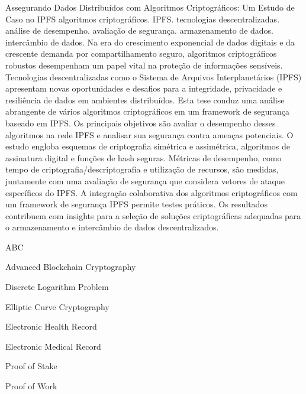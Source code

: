 \documentclass[cic,tc,english]{iiufrgs}
\begin{document}
\begin{translatedabstract}
    { %
        Assegurando Dados Distribuídos com Algoritmos Criptográficos: Um Estudo de 
        Caso no IPFS
    }{ %
        algoritmos criptográficos. 
        IPFS. 
        tecnologias descentralizadas. 
        análise de desempenho. 
        avaliação de segurança. 
        armazenamento de dados. 
        intercâmbio de dados.
    }
    Na era do crescimento exponencial de dados digitais e da crescente demanda 
    por compartilhamento seguro, algoritmos criptográficos robustos desempenham 
    um papel vital na proteção de informações sensíveis. Tecnologias 
    descentralizadas como o Sistema de Arquivos Interplanetários (IPFS) 
    apresentam novas oportunidades e desafios para a integridade, privacidade 
    e resiliência de dados em ambientes distribuídos. Esta tese conduz uma 
    análise abrangente de vários algoritmos criptográficos em um framework de 
    segurança baseado em IPFS. Os principais objetivos são avaliar o desempenho 
    desses algoritmos na rede IPFS e analisar sua segurança contra ameaças 
    potenciais. O estudo engloba esquemas de criptografia simétrica e 
    assimétrica, algoritmos de assinatura digital e funções de hash seguras. 
    Métricas de desempenho, como tempo de criptografia/descriptografia e 
    utilização de recursos, são medidas, juntamente com uma avaliação de 
    segurança que considera vetores de ataque específicos do IPFS. A integração 
    colaborativa dos algoritmos criptográficos com um framework de segurança 
    IPFS permite testes práticos. Os resultados contribuem com insights para a 
    seleção de soluções criptográficas adequadas para o armazenamento e 
    intercâmbio de dados descentralizados.
\end{translatedabstract}

\listoffigures

\listoftables

\begin{listofabbrv}{ABC} %
    \item[ABC] Advanced Blockchain Cryptography
    \item[DLP] Discrete Logarithm Problem
    \item[ECC] Elliptic Curve Cryptography
    \item[EHR] Electronic Health Record
    \item[EMR] Electronic Medical Record
    \item[PoS] Proof of Stake
    \item[PoW] Proof of Work
\end{listofabbrv}
\end{document}
